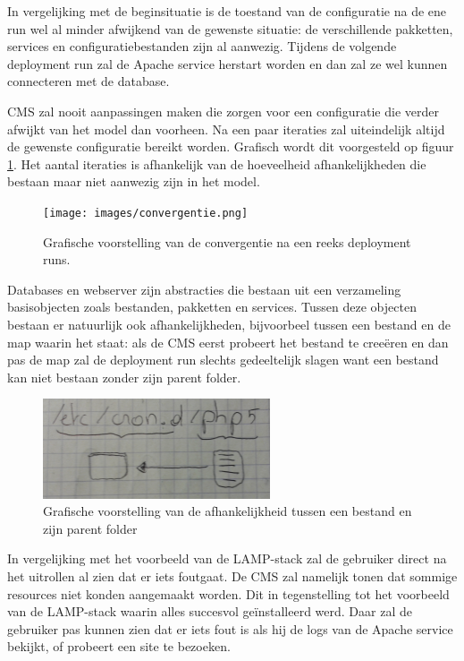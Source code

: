 In vergelijking met de beginsituatie is de toestand van de configuratie na de ene run wel al minder afwijkend van de gewenste situatie:
de verschillende pakketten, services en configuratiebestanden zijn al aanwezig.
Tijdens de volgende deployment run zal de Apache service herstart worden en dan zal ze wel kunnen connecteren met de database.

CMS zal nooit aanpassingen maken die zorgen voor een configuratie die verder afwijkt van het model dan voorheen.
Na een paar iteraties zal uiteindelijk altijd de gewenste configuratie bereikt worden. 
Grafisch wordt dit voorgesteld op figuur \ref{fig:convergentie}.
Het aantal iteraties is afhankelijk van de hoeveelheid afhankelijkheden die bestaan maar niet aanwezig zijn in het model.

\begin{figure}[h]
    \begin{center}
    \texttt{[image: images/convergentie.png]}
    \caption{Grafische voorstelling van de convergentie na een reeks deployment runs.}
    \label{fig:convergentie}
    \end{center}
\end{figure}

Databases en webserver zijn abstracties die bestaan uit een verzameling basisobjecten zoals bestanden, pakketten en services.
Tussen deze objecten bestaan er natuurlijk ook afhankelijkheden, bijvoorbeel tussen een bestand en de map waarin het staat:
als de CMS eerst probeert het bestand te cree\"eren en dan pas de map zal de deployment run slechts gedeeltelijk slagen want een bestand kan niet bestaan zonder zijn parent folder.
\begin{figure}[h]
    \begin{center}
    \includegraphics[width=0.6\textwidth]{images/file_dir_dep.png}
    \caption{Grafische voorstelling van de afhankelijkheid tussen een bestand en zijn parent folder}
    \label{fig:file_dir_dep}
    \end{center}
\end{figure}
In vergelijking met het voorbeeld van de LAMP-stack zal de gebruiker direct na het uitrollen al zien dat er iets foutgaat.
De CMS zal namelijk tonen dat sommige resources niet konden aangemaakt worden.
Dit in tegenstelling tot het voorbeeld van de LAMP-stack waarin alles succesvol ge\"installeerd werd. 
Daar zal de gebruiker pas kunnen zien dat er iets fout is als hij de logs van de Apache service bekijkt, of probeert een site te bezoeken.


